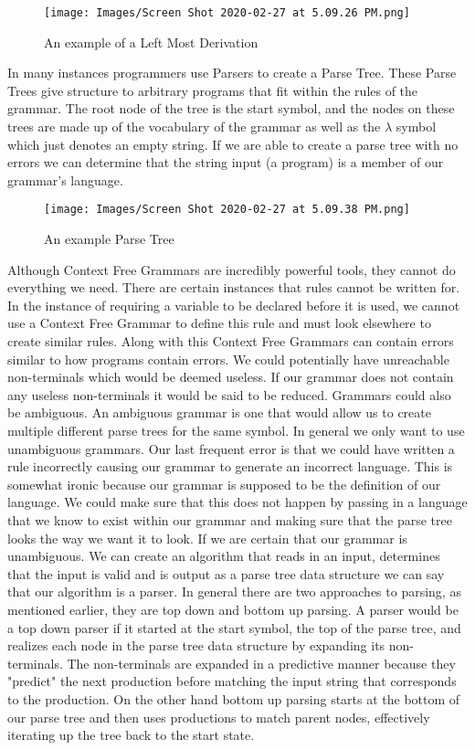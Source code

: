 \documentclass[sigconf]{acmart}
\begin{document}
\newline
\begin{figure}
  \texttt{[image: Images/Screen Shot 2020-02-27 at 5.09.26 PM.png]} 
  \caption{An example of a Left Most Derivation}
\end{figure}
\newline
\newline
In many instances programmers use Parsers to create a Parse Tree. These Parse Trees give structure to arbitrary programs that fit within the rules of the grammar. The root node of the tree is the start symbol, and the nodes on these trees are made up of the vocabulary of the grammar as well as the $\lambda$ symbol which just denotes an empty string. If we are able to create a parse tree with no errors we can determine that the string input (a program) is a member of our grammar's language. 
\newline
\begin{figure}
  \texttt{[image: Images/Screen Shot 2020-02-27 at 5.09.38 PM.png]}
  \caption{An example Parse Tree}
\end{figure}
\newline
Although Context Free Grammars are incredibly powerful tools, they cannot do everything we need. There are certain instances that rules cannot be written for. In the instance of requiring a variable to be declared before it is used, we cannot use a Context Free Grammar to define this rule and must look elsewhere to create similar rules. Along with this Context Free Grammars can contain errors similar to how programs contain errors. We could potentially have unreachable non-terminals which would be deemed useless. If our grammar does not contain any useless non-terminals it would be said to be reduced. Grammars could also be ambiguous. An ambiguous grammar is one that would allow us to create multiple different parse trees for the same symbol. In general we only want to use unambiguous grammars. Our last frequent error is that we could have written a rule incorrectly causing our grammar to generate an incorrect language. This is somewhat ironic because our grammar is supposed to be the definition of our language. We could make sure that this does not happen by passing in a language that we know to exist within our grammar and making sure that the parse tree looks the way we want it to look.
\newline
If we are certain that our grammar is unambiguous. We can create an algorithm that reads in an input, determines that the input is valid and is output as a parse tree data structure we can say that our algorithm is a parser. In general there are two approaches to parsing, as mentioned earlier, they are top down and bottom up parsing. A parser would be a top down parser if it started at the start symbol, the top of the parse tree, and realizes each node in the parse tree data structure by expanding its non-terminals. The non-terminals are expanded in a predictive manner because they "predict" the next production before matching the input string that corresponds to the production. On the other hand bottom up parsing starts at the bottom of our parse tree and then uses productions to match parent nodes, effectively iterating up the tree back to the start state.
\end{document}
